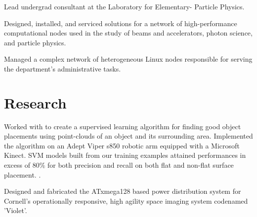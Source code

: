 \documentclass[]{deedy-resume-openfont}
\begin{document}
    \begin{tightemize}
        \item
            Lead undergrad consultant at the Laboratory for Elementary-
            Particle Physics.
        \item
            Designed, installed, and serviced solutions for a network of
            high-performance computational nodes used in the study of beams
            and accelerators, photon science, and particle physics.
        \item
            Managed a complex network of heterogeneous Linux nodes
            responsible for serving the department’s administrative tasks.
    \end{tightemize}
\sectionsep

\section{Research}
            Worked with  to create a supervised learning algorithm
            for finding good object placements using point-clouds of an object
            and its surrounding area. Implemented the algorithm on an Adept
            Viper s850 robotic arm equipped with a Microsoft Kinect. SVM models
            built from our training examples attained performances in excess of
            80\% for both precision and recall on both flat and non-flat
            surface placement.
            .
    \sectionsep

            Designed and fabricated the ATxmega128 based power distribution
            system for Cornell’s operationally responsive, high agility
            space imaging system codenamed 'Violet'.
    \sectionsep
\end{document}
